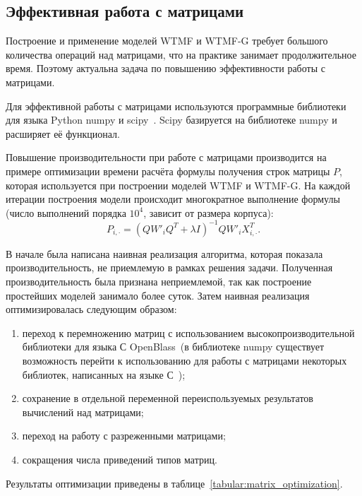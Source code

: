 
\subsection{Эффективная работа с матрицами}
    Построение и применение моделей WTMF и WTMF-G требует большого количества операций над матрицами, что на практике занимает продолжительное время.
    Поэтому актуальна задача по повышению эффективности работы с матрицами.

    Для эффективной работы с матрицами используются программные библиотеки для языка Python numpy и
    scipy~\cite{scipy}. Scipy базируется на библиотеке numpy и расширяет её функционал.

    Повышение производительности при работе с матрицами производится на примере оптимизации времени расчёта формулы получения строк матрицы $P$,
    которая используется при построении моделей WTMF и WTMF-G.
    На каждой итерации построения модели происходит многократное выполнение формулы (число выполнений порядка $10^4$, зависит от размера корпуса):
    \begin{equation}
        P_{i, \cdot} = (Q W'_i Q^T + \lambda I)^{-1} Q W'_i X_{i,\cdot}^T.
    \end{equation}

    В начале была написана наивная реализация алгоритма, которая показала производительность, не приемлемую в рамках решения задачи.
    Полученная производительность была признана неприемлемой, так как построение простейших моделей занимало более суток.
    Затем наивная реализация оптимизировалась следующим образом:
    \begin{enumerate}
        \item переход к перемножению матриц с использованием высокопроизводительной библиотеки для языка С OpenBlass~(в библиотеке numpy существует возможность перейти к использованию для работы с матрицами некоторых библиотек, написанных на языке С~\cite{blas_installation});
        \item сохранение в отдельной переменной переиспользуемых результатов вычислений над матрицами;
        \item переход на работу с разреженными матрицами;
        \item сокращения числа приведений типов матриц.
    \end{enumerate}
    Результаты оптимизации приведены в таблице~\ref{tabular:matrix_optimization}.

